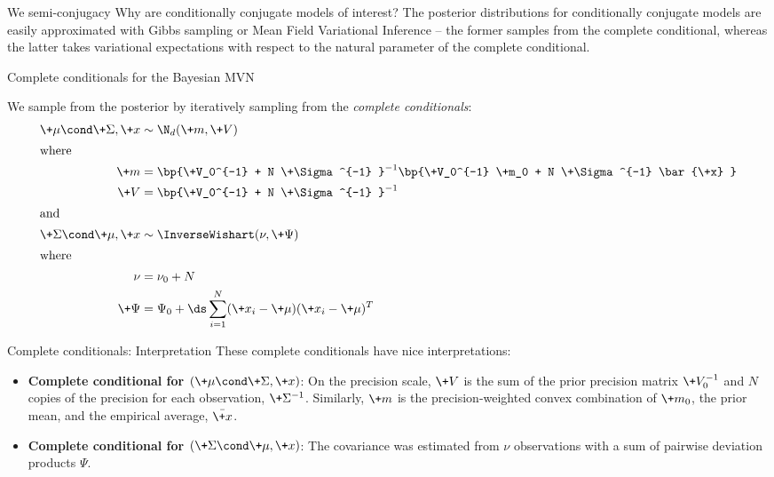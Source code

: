\documentclass[10pt]{beamer}
\begin{document}
\begin{frame}{We {\red \heart} semi-conjugacy}	 
 Why are conditionally conjugate models of interest?  The posterior distributions for conditionally conjugate models are easily approximated with Gibbs sampling or Mean Field Variational Inference -- the former samples from the complete conditional,  whereas the latter takes variational expectations with respect to the natural parameter of the complete conditional.   
 
\end{frame}


	
\begin{frame}{Complete conditionals for the Bayesian MVN}
	
We sample from the posterior by iteratively sampling from the \textit{complete conditionals}:
\footnotesize 
\begin{align*}
\+\mu  \cond \+\Sigma, \+x &\sim \N_{d}(\+m,\+V ) \\ %
\intertext{where}
\+m  &=  \bp{\+V_0^{-1} + N  \+\Sigma^{-1} }^{-1}  \bp{\+V_0^{-1} \+m_0 + N \+\Sigma^{-1}  \bar{\+x} } \\
\+V &= \bp{\+V_0^{-1} +  N \+\Sigma^{-1} }^{-1} \\
\intertext{and}
\+\Sigma \cond \+\mu,  \+x  &\sim \InverseWishart(\nu,  \+\Psi) \\
\intertext{where}
\nu &=  \nu_0 + N \\
\+\Psi &= \Psi_0 + \ds\sum_{i=1}^N  (\+x_i - \+\mu) (\+x_i - \+\mu)^T 
\end{align*}
\end{frame}


 
\begin{frame}{Complete conditionals: Interpretation}
These complete conditionals have nice interpretations:
\begin{itemize}
\item \textbf{Complete conditional for $(\+\mu  \cond \+\Sigma, \+x)$}: On the precision scale,  $\+V$ is the sum of the prior precision matrix $\+V_0^{-1}$ and $N$ copies of the precision for each observation,  $\+\Sigma^{-1}$.    Similarly,  $\+m$ is the precision-weighted convex combination of $\+m_0$, the prior mean,    and the empirical average, $\bar{\+x}$.
\item \textbf{Complete conditional for $(\+\Sigma \cond \+\mu,  \+x)$}:  The covariance was estimated from $\nu$ observations with a sum of pairwise deviation products $\Psi$.
\end{itemize}
\end{frame}
\end{document}
